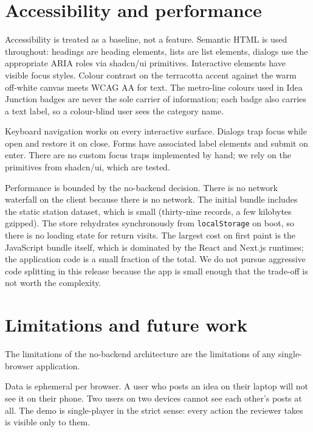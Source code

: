 \documentclass[a4paper,11pt]{article}
\begin{document}
\section{Accessibility and performance}

Accessibility is treated as a baseline, not a feature. Semantic HTML is used
throughout: headings are heading elements, lists are list elements, dialogs
use the appropriate ARIA roles via shadcn/ui primitives. Interactive elements
have visible focus styles. Colour contrast on the terracotta accent against
the warm off-white canvas meets WCAG AA for text. The metro-line colours used
in Idea Junction badges are never the sole carrier of information; each badge
also carries a text label, so a colour-blind user sees the category name.

Keyboard navigation works on every interactive surface. Dialogs trap focus
while open and restore it on close. Forms have associated label elements and
submit on enter. There are no custom focus traps implemented by hand; we rely
on the primitives from shadcn/ui, which are tested.

Performance is bounded by the no-backend decision. There is no network
waterfall on the client because there is no network. The initial bundle
includes the static station dataset, which is small (thirty-nine records, a
few kilobytes gzipped). The store rehydrates synchronously from
\texttt{localStorage} on boot, so there is no loading state for return
visits. The largest cost on first paint is the JavaScript bundle itself,
which is dominated by the React and Next.js runtimes; the application code is
a small fraction of the total. We do not pursue aggressive code splitting in
this release because the app is small enough that the trade-off is not worth
the complexity.


\section{Limitations and future work}
\label{sec:limitations}

The limitations of the no-backend architecture are the limitations of any
single-browser application.

Data is ephemeral per browser. A user who posts an idea on their laptop will
not see it on their phone. Two users on two devices cannot see each other's
posts at all. The demo is single-player in the strict sense: every action
the reviewer takes is visible only to them.
\end{document}
